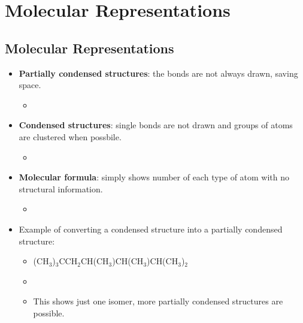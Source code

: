\documentclass[12pt,a4paper]{article}
\begin{document}
\clearpage
\section{Molecular Representations}
\subsection{Molecular Representations}
\begin{itemize}
    \item \textbf{Partially condensed structures}: the  bonds are not always drawn, saving space.
        \begin{itemize}
            \item \small{}
        \end{itemize}
    \item \textbf{Condensed structures}: single bonds are not drawn and groups of atoms are clustered when possbile.
        \begin{itemize}
            \item {}
        \end{itemize}
    \item \textbf{Molecular formula}: simply shows number of each type of atom with no structural information.
        \begin{itemize}
            \item {}
        \end{itemize}
    \item Example of converting a condensed structure into a partially condensed structure:
        \begin{itemize}
            \item ({\color{o-Sun}CH\(_{3}\)})\(_{3}\){\color{Liblue}CC}H\(_{2}\){\color{Liblue}C}H({\color{o-Sun}CH\(_{3}\)}){\color{Liblue}C}H({\color{o-Sun}CH\(_{3}\)}){\color{Liblue}C}H({\color{o-Sun}CH\(_{3}\)})\(_{2}\)
            \item {}
            \item This shows just one isomer, more partially condensed structures are possible.
        \end{itemize}
\end{itemize}
\end{document}
